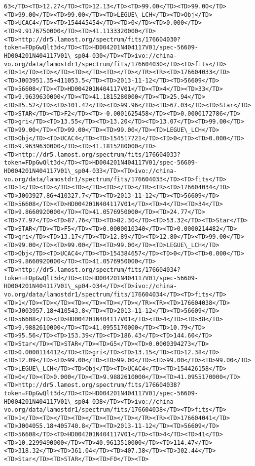 \documentclass[11pt]{article}
\begin{document}
\begin{Verbatim}[commandchars=\\\{\}]
63</TD><TD>12.27</TD><TD>12.13</TD><TD>99.00</TD><TD>99.00</TD><TD>99.00</TD><TD>99.00</TD><TD>LEGUE\_LCH</TD><TD>Obj</TD><TD>UCAC4</TD><TD>154445454</TD><TD>0</TD><TD>0.000</TD><TD>9.9176750000</TD><TD>41.1133320000</TD><TD>http://dr5.lamost.org/spectrum/fits/176604030?token=FDpGwQlt3d</TD><TD>HD004201N404117V01/spec-56609-HD004201N404117V01\_sp04-030</TD><TD>ivo://china-vo.org/data/lamostdr1/spectrum/fits/176604030</TD><TD>fits</TD><TD>1</TD><TD></TD><TD></TD><TD></TD></TR><TR><TD>176604033</TD><TD>J003951.35+411053.5</TD><TD>2013-11-12</TD><TD>56609</TD><TD>56608</TD><TD>HD004201N404117V01</TD><TD>4</TD><TD>33</TD><TD>9.9639630000</TD><TD>41.1815280000</TD><TD>25.94</TD><TD>85.52</TD><TD>101.42</TD><TD>99.96</TD><TD>67.03</TD><TD>Star</TD><TD>STAR</TD><TD>F2</TD><TD>-0.0001625458</TD><TD>0.0000172786</TD><TD>gri</TD><TD>13.55</TD><TD>13.20</TD><TD>13.07</TD><TD>99.00</TD><TD>99.00</TD><TD>99.00</TD><TD>99.00</TD><TD>LEGUE\_LCH</TD><TD>Obj</TD><TD>UCAC4</TD><TD>154517721</TD><TD>0</TD><TD>0.000</TD><TD>9.9639630000</TD><TD>41.1815280000</TD><TD>http://dr5.lamost.org/spectrum/fits/176604033?token=FDpGwQlt3d</TD><TD>HD004201N404117V01/spec-56609-HD004201N404117V01\_sp04-033</TD><TD>ivo://china-vo.org/data/lamostdr1/spectrum/fits/176604033</TD><TD>fits</TD><TD>1</TD><TD></TD><TD></TD><TD></TD></TR><TR><TD>176604034</TD><TD>J003927.86+410327.7</TD><TD>2013-11-12</TD><TD>56609</TD><TD>56608</TD><TD>HD004201N404117V01</TD><TD>4</TD><TD>34</TD><TD>9.8660920000</TD><TD>41.0576950000</TD><TD>24.77</TD><TD>77.97</TD><TD>87.76</TD><TD>82.30</TD><TD>53.32</TD><TD>Star</TD><TD>STAR</TD><TD>F5</TD><TD>0.0000010340</TD><TD>0.0000214482</TD><TD>gri</TD><TD>13.17</TD><TD>12.89</TD><TD>12.80</TD><TD>99.00</TD><TD>99.00</TD><TD>99.00</TD><TD>99.00</TD><TD>LEGUE\_LCH</TD><TD>Obj</TD><TD>UCAC4</TD><TD>154384657</TD><TD>0</TD><TD>0.000</TD><TD>9.8660920000</TD><TD>41.0576950000</TD><TD>http://dr5.lamost.org/spectrum/fits/176604034?token=FDpGwQlt3d</TD><TD>HD004201N404117V01/spec-56609-HD004201N404117V01\_sp04-034</TD><TD>ivo://china-vo.org/data/lamostdr1/spectrum/fits/176604034</TD><TD>fits</TD><TD>1</TD><TD></TD><TD></TD><TD></TD></TR><TR><TD>176604038</TD><TD>J003957.18+410543.8</TD><TD>2013-11-12</TD><TD>56609</TD><TD>56608</TD><TD>HD004201N404117V01</TD><TD>4</TD><TD>38</TD><TD>9.9882610000</TD><TD>41.0955170000</TD><TD>10.79</TD><TD>95.56</TD><TD>153.39</TD><TD>186.43</TD><TD>144.60</TD><TD>Star</TD><TD>STAR</TD><TD>G5</TD><TD>0.0000394273</TD><TD>0.0000114412</TD><TD>gri</TD><TD>13.15</TD><TD>12.38</TD><TD>12.09</TD><TD>99.00</TD><TD>99.00</TD><TD>99.00</TD><TD>99.00</TD><TD>LEGUE\_LCH</TD><TD>Obj</TD><TD>UCAC4</TD><TD>154426158</TD><TD>0</TD><TD>0.000</TD><TD>9.9882610000</TD><TD>41.0955170000</TD><TD>http://dr5.lamost.org/spectrum/fits/176604038?token=FDpGwQlt3d</TD><TD>HD004201N404117V01/spec-56609-HD004201N404117V01\_sp04-038</TD><TD>ivo://china-vo.org/data/lamostdr1/spectrum/fits/176604038</TD><TD>fits</TD><TD>1</TD><TD></TD><TD></TD><TD></TD></TR><TR><TD>176604041</TD><TD>J004055.18+405740.8</TD><TD>2013-11-12</TD><TD>56609</TD><TD>56608</TD><TD>HD004201N404117V01</TD><TD>4</TD><TD>41</TD><TD>10.2299490000</TD><TD>40.9613510000</TD><TD>114.47</TD><TD>318.32</TD><TD>361.04</TD><TD>407.38</TD><TD>302.44</TD><TD>Star</TD><TD>STAR</TD><TD>F0</TD><TD>
\end{Verbatim}
\end{document}

